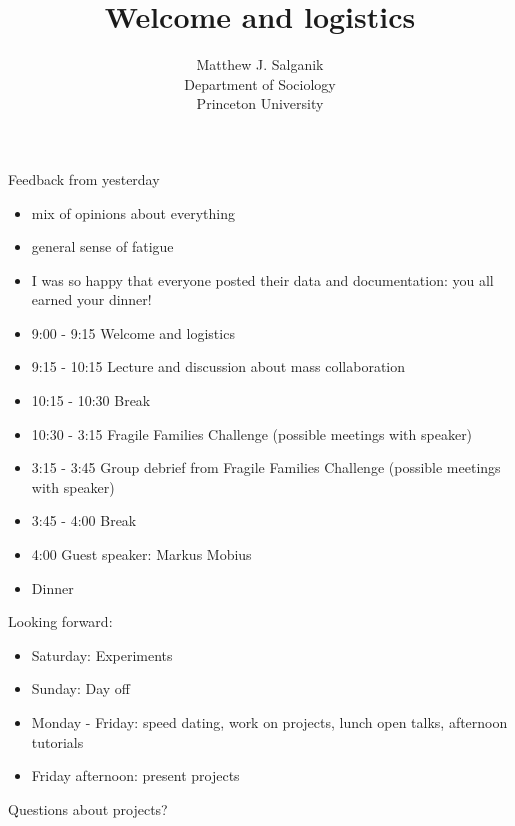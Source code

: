 \documentclass[aspectratio=169]{beamer}
\title[]{Welcome and logistics}
\author[]{Matthew J. Salganik\\Department of Sociology\\Princeton University}
\date[]{Summer Institute in Computational Social Science\\June 23, 2017
\vfill
\begin{flushright}
\vspace{0.6in}
\texttt{[image: figures/cc-by.png]}
\end{flushright}
}
\begin{document}
\frame{\titlepage}
\begin{frame}

Feedback from yesterday
\begin{itemize}
\item mix of opinions about everything
\pause
\item general sense of fatigue
\pause 
\item I was so happy that everyone posted their data and documentation: you all earned your dinner!
\end{itemize}

\end{frame}
\begin{frame}

\begin{itemize}
\item 9:00 - 9:15 Welcome and logistics
\item 9:15 - 10:15 Lecture and discussion about mass collaboration
\item 10:15 - 10:30 Break 
\item 10:30 - 3:15 Fragile Families Challenge (possible meetings with speaker)
\item 3:15 - 3:45 Group debrief from Fragile Families Challenge (possible meetings with speaker)
\item 3:45 - 4:00 Break
\item 4:00 Guest speaker: Markus Mobius
\item Dinner
\end{itemize}

\end{frame}
\begin{frame}

Looking forward:
\begin{itemize}
\item Saturday: Experiments
\item Sunday: Day off
\item Monday - Friday: speed dating, work on projects, lunch open talks, afternoon tutorials
\item Friday afternoon: present projects
\end{itemize}

\end{frame}
\begin{frame}

Questions about projects?

\end{frame}
\end{document}
